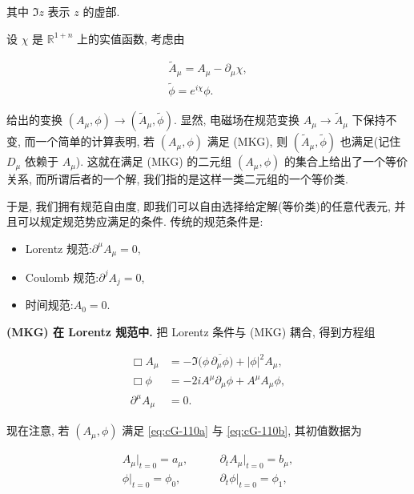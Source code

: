 其中 $\Im z$ 表示 $z$ 的虚部. 

设 $\chi$ 是 $\mathbb{R}^{1+n}$ 上的实值函数, 考虑由

\[
\begin{array}{c}
\widetilde{A}_{\mu} = A_{\mu} - \partial_{\mu}\chi,  \\
\widetilde{\phi} = e^{i\chi}\phi.
\end{array}
\]

给出的变换 $(A_{\mu}, \phi)\to (\widetilde{A}_{\mu}, \widetilde{\phi})$. 显然, 电磁场在规范变换 $A_{\mu} \rightarrow \widetilde{A}_{\mu}$ 下保持不变, 而一个简单的计算表明, 若 $(A_{\mu},  \phi)$ 满足 (MKG), 则 $(\widetilde{A}_{\mu},  \widetilde{\phi})$ 也满足(记住 $D_{\mu}$ 依赖于 $A_{\mu}$). 这就在满足 (MKG) 的二元组 $(A_{\mu},  \phi)$ 的集合上给出了一个等价关系, 而所谓后者的一个解, 我们指的是这样一类二元组的一个等价类. 

于是, 我们拥有规范自由度, 即我们可以自由选择给定解(等价类)的任意代表元, 并且可以规定规范势应满足的条件. 传统的规范条件是:

\begin{itemize}
\item Lorentz 规范:$\partial^{\mu}A_{\mu}=0, $
\item Coulomb 规范:$\partial^{j}A_{j}=0$, 
\item 时间规范:$A_0 = 0$. 
\end{itemize}

\noindent\textbf{(MKG) 在 Lorentz 规范中. }把 Lorentz 条件与 (MKG) 耦合, 得到方程组

\begin{subequations}\label{eq:cG-110}
\begin{align}
\Box A_{\mu} &= -\Im\big(\phi\, \overline{\partial_{\mu}\phi}\big) + |\phi|^{2}A_{\mu},  \label{eq:cG-110a} \\
\Box \phi &= -2iA^{\mu}\partial_{\mu}\phi + A^{\mu}A_{\mu}\phi,  \label{eq:cG-110b} \\
\partial^{\mu}A_{\mu} &= 0. \label{eq:cG-110c}
\end{align}
\end{subequations}

现在注意, 若 $(A_{\mu},  \phi)$ 满足 \eqref{eq:cG-110a} 与 \eqref{eq:cG-110b}, 其初值数据为

\begin{subequations}\label{eq:cG-111}
\begin{align}
A_{\mu}|_{t = 0} = a_{\mu},  \qquad &\partial_{t}A_{\mu}|_{t = 0} = b_{\mu},  \label{eq:cG-111a} \\
\phi|_{t = 0} = \phi_{0},  \qquad &\partial_{t}\phi|_{t = 0} = \phi_{1},  \label{eq:cG-111b}
\end{align}
\end{subequations}

